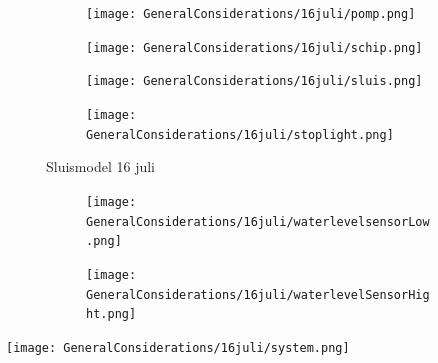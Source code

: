 \documentclass{article}
\begin{document}
	\begin{figure}
		\centering
		\begin{subfigure}{0.45\linewidth}
			\texttt{[image: GeneralConsiderations/16juli/pomp.png]}
			\caption{}
			\label{fig:1a}
		\end{subfigure}\hfill
		\begin{subfigure}{0.45\linewidth}
			\texttt{[image: GeneralConsiderations/16juli/schip.png]}
			\caption{}
			\label{fig:1a}
		\end{subfigure}
		
		\begin{subfigure}{0.45\linewidth}
			\texttt{[image: GeneralConsiderations/16juli/sluis.png]}
			\caption{}
			\label{fig:1a}
		\end{subfigure}\hfill
		\begin{subfigure}{0.45\linewidth}
			\texttt{[image: GeneralConsiderations/16juli/stoplight.png]}
			\caption{}
			\label{fig:1a}
		\end{subfigure}
		\caption{Sluismodel 16 juli}
		\label{fig:1}
	\end{figure}
	
	
	\begin{figure}
		\centering
		\begin{subfigure}{0.45\linewidth}
			\texttt{[image: GeneralConsiderations/16juli/waterlevelsensorLow.png]}
			\caption{}
			\label{fig:1a}
		\end{subfigure}\hfill
		\begin{subfigure}{0.45\linewidth}
			\texttt{[image: GeneralConsiderations/16juli/waterlevelSensorHight.png]}
			\caption{}
			\label{fig:1a}
		\end{subfigure}
	\end{figure}
	\texttt{[image: GeneralConsiderations/16juli/system.png]}
	
	\newpage
\end{document}
